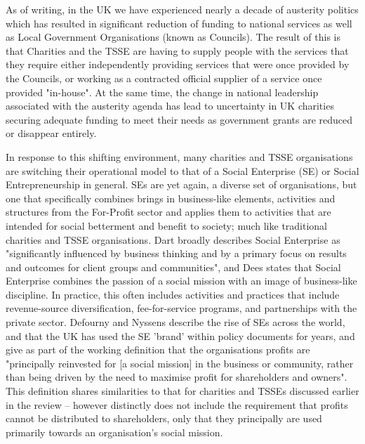 As of writing, in the UK we have experienced nearly a decade of austerity politics which has resulted in significant reduction of funding to national services as well as Local Government Organisations (known as Councils). The result of this is that Charities and the TSSE are having to supply people with the services that they require either independently providing services that were once provided by the Councils, or working as a contracted official supplier of a service once provided "in-house". At the same time, the change in national leadership associated with the austerity agenda has lead to uncertainty in UK charities securing adequate funding to meet their needs as government grants are reduced or disappear entirely.

In response to this shifting environment, many charities and TSSE organisations are switching their operational model to that of a Social Enterprise (SE) or Social Entrepreneurship in general. SEs are yet again, a diverse set of organisations, but one that specifically combines brings in business-like elements, activities and structures from the For-Profit sector and applies them to activities that are intended for social betterment and benefit to society; much like traditional charities and TSSE organisations. Dart broadly describes Social Enterprise as "significantly influenced by business thinking and by a primary focus on results and outcomes for client groups and communities", and Dees states that Social Enterprise combines the passion of a social mission with an image of business-like discipline. In practice, this often includes activities and practices that include revenue-source diversification, fee-for-service programs, and partnerships with the private sector. Defourny and Nyssens describe the rise of SEs across the world, and that the UK has used the SE 'brand' within policy documents for years, and give as part of the working definition that the organisations profits are "principally reinvested for [a social mission] in the business or community, rather than being driven by the need to maximise profit for shareholders and owners". This definition shares similarities to that for charities and TSSEs discussed earlier in the review -- however distinctly does not include the requirement that profits cannot be distributed to shareholders, only that they principally are used primarily towards an organisation's social mission.

